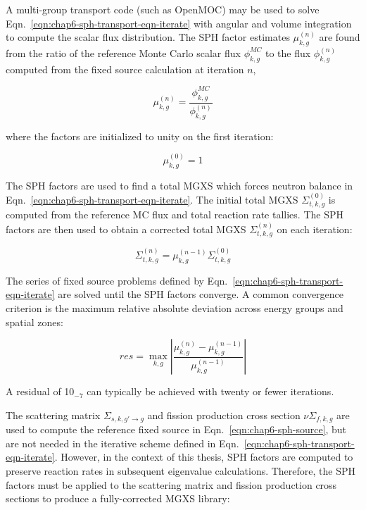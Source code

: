 \noindent A multi-group transport code (such as OpenMOC) may be used to solve Eqn.~\ref{eqn:chap6-sph-transport-eqn-iterate} with angular and volume integration to compute the scalar flux distribution. The \ac{SPH} factor estimates $\mu_{k,g}^{(n)}$ are found from the ratio of the reference Monte Carlo scalar flux $\phi_{k,g}^{MC}$ to the flux $\phi_{k,g}^{(n)}$ computed from the fixed source calculation at iteration $n$,

\begin{equation}
\label{eqn:chap6-sph-update}
\mu_{k,g}^{(n)} = \frac{\phi_{k,g}^{MC}}{\phi_{k,g}^{(n)}}
\end{equation}

\noindent where the factors are initialized to unity on the first iteration:

\begin{dmath}
\label{eqn:chap6-sph-initial}
\mu_{k,g}^{(0)} = 1
\end{dmath}

The \ac{SPH} factors are used to find a total \ac{MGXS} which forces neutron balance in Eqn.~\ref{eqn:chap6-sph-transport-eqn-iterate}. The initial total \ac{MGXS} $\Sigma_{t,k,g}^{(0)}$ is computed from the reference \ac{MC} flux and total reaction rate tallies. The \ac{SPH} factors are then used to obtain a corrected total \ac{MGXS} $\Sigma_{t,k,g}^{(n)}$ on each iteration:

\begin{dmath}
\label{eqn:chap6-sph-update-sigt}
\Sigma_{t,k,g}^{(n)} = \mu_{k,g}^{(n-1)}\Sigma_{t,k,g}^{(0)}
\end{dmath}

The series of fixed source problems defined by Eqn.~\ref{eqn:chap6-sph-transport-eqn-iterate} are solved until the \ac{SPH} factors converge. A common convergence criterion is the maximum relative absolute deviation across energy groups and spatial zones:

\begin{dmath}
\label{eqn:chap6-sph-residual}
res = \max_{k,g} \left|\frac{\mu_{k,g}^{(n)} - \mu_{k,g}^{(n-1)}}{\mu_{k,g}^{(n-1)}}\right|
\end{dmath}

\noindent A residual of 10$_{-7}$ can typically be achieved with twenty or fewer iterations.

The scattering matrix $\Sigma_{s,k,g'\rightarrow g}$ and fission production cross section $\nu\Sigma_{f,k,g}$ are used to compute the reference fixed source in Eqn.~\ref{eqn:chap6-sph-source}, but are not needed in the iterative scheme defined in Eqn.~\ref{eqn:chap6-sph-transport-eqn-iterate}. However, in the context of this thesis, \ac{SPH} factors are computed to preserve reaction rates in subsequent eigenvalue calculations. Therefore, the \ac{SPH} factors must be applied to the scattering matrix and fission production cross sections to produce a fully-corrected \ac{MGXS} library:

